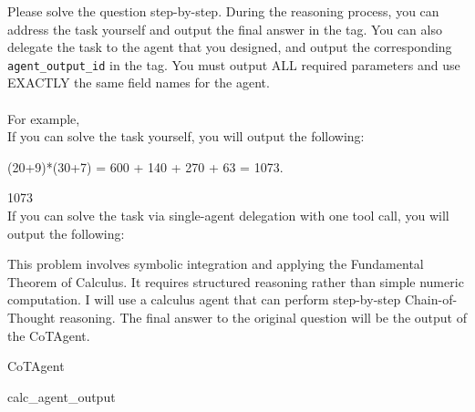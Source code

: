 \begin{userprompt}[title={User Prompt}]
Please solve the question step-by-step. During the reasoning process, you can address the task yourself and output the final answer in the  tag. You can also delegate the task to the agent that you designed, and output the corresponding \texttt{agent_output_id} in the  tag. You must output ALL required parameters and use EXACTLY the same field names for the agent. \\
\\
For example,
\\
If you can solve the task yourself, you will output the following:\\


(20+9)*(30+7) = 600 + 140 + 270 + 63 = 1073.


1073
\\

If you can solve the task via single-agent delegation with one tool call, you will output the following:\\


This problem involves symbolic integration and applying the Fundamental Theorem of Calculus.
It requires structured reasoning rather than simple numeric computation.
I will use a calculus agent that can perform step-by-step Chain-of-Thought reasoning.
The final answer to the original question will be the output of the CoTAgent.



\quad{}CoTAgent

\quad{}

\quad{}

\qquad{}

\quad{}

\quad{}
calc_agent_output


 \\


\end{userprompt}
